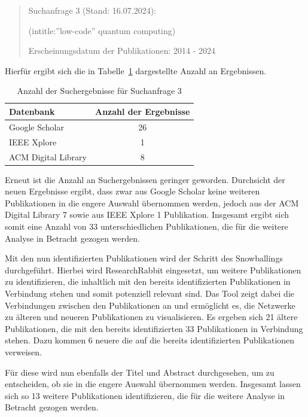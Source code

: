 \begin{quote}
    Suchanfrage 3 (Stand: 16.07.2024):

    (intitle:''low-code'' quantum computing)

    Erscheinungsdatum der Publikationen: 2014 - 2024
\end{quote}

Hierfür ergibt sich die in Tabelle~\ref{tab:search_3_results} dargestellte Anzahl an Ergebnissen. 

\begin{table}[h!]
    \centering
    \caption{Anzahl der Suchergebnisse für Suchanfrage 3}
    \label{tab:search_3_results}
    \begin{tabular}{|l|c|}
    \hline
    \textbf{Datenbank} & \textbf{Anzahl der Ergebnisse} \\ \hline
    Google Scholar & 26 \\ \hline
    IEEE Xplore & 1 \\ \hline
    ACM Digital Library & 8 \\ \hline
    \end{tabular}
\end{table}

Erneut ist die Anzahl an Suchergebnissen geringer geworden. Durchsicht der neuen Ergebnisse ergibt, dass zwar aus Google Scholar 
keine weiteren Publikationen in die engere Auswahl übernommen werden, jedoch aus der ACM Digital Library 7 sowie aus IEEE Xplore 1 Publikation. 
Insgesamt ergibt sich somit eine Anzahl von 33 unterschiedlichen Publikationen, die für die weitere Analyse in Betracht gezogen werden. 

Mit den nun identifizierten Publikationen wird der Schritt des Snowballings durchgeführt. Hierbei wird ResearchRabbit eingesetzt, um 
weitere Publikationen zu identifizieren, die inhaltlich mit den bereits identifizierten Publikationen in Verbindung stehen und somit 
potenziell relevant sind. Das Tool zeigt dabei die Verbindungen zwischen den Publikationen an und ermöglicht es, die Netzwerke 
zu älteren und neueren Publikationen zu visualisieren. Es ergeben sich 21 ältere Publikationen, die mit den bereits identifizierten 33 
Publikationen in Verbindung stehen. Dazu kommen 6 neuere die auf die bereits identifizierten Publikationen verweisen. 

Für diese wird nun ebenfalls der Titel und Abstract durchgesehen, um zu entscheiden, ob sie in die engere Auswahl übernommen werden. 
Insgesamt lassen sich so 13 weitere Publikationen identifizieren, die für die weitere Analyse in Betracht gezogen werden. 

